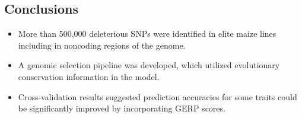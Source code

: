 \documentclass[a0,portrait]{a0poster}
\begin{document}
\begin{multicols}{2}

\color{SaddleBrown} %

\section*{Conclusions}

\begin{itemize}
\item More than 500,000 deleterious SNPs were identified in elite maize lines including in noncoding regions of the genome.
\item A genomic selection pipeline was developed, which utilized evolutionary conservation information in the model.
\item Cross-validation results suggested prediction accuracies for some traits could be significantly improved by incorporating GERP scores. 
\end{itemize}

\color{DarkSlateGray} %







\end{multicols}
\end{document}
